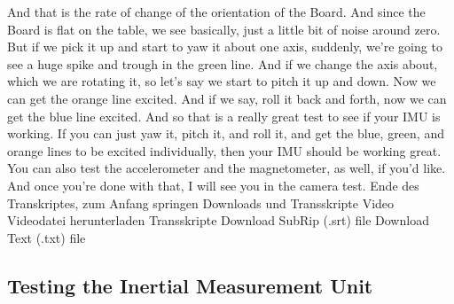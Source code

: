 And that is the rate of change of the orientation of the Board.
And since the Board is flat on the table,
we see basically, just a little bit of noise around zero.
But if we pick it up and start to yaw it about one axis,
suddenly, we're going to see a huge spike and trough in the green line.
And if we change the axis about, which we are rotating it,
so let's say we start to pitch it up and down.
Now we can get the orange line excited.
And if we say, roll it back and forth, now we can get the blue line excited.
And so that is a really great test to see if your IMU is working.
If you can just yaw it, pitch it, and roll it, and get the blue, green,
and orange lines to be excited individually,
then your IMU should be working great.
You can also test the accelerometer and the magnetometer,
as well, if you'd like.
And once you're done with that, I will see you in the camera test.
Ende des Transkriptes, zum Anfang springen
Downloads und Transskripte
Video
Videodatei herunterladen
Transskripte
Download SubRip (.srt) file
Download Text (.txt) file

\subsection{Testing the Inertial Measurement Unit}

